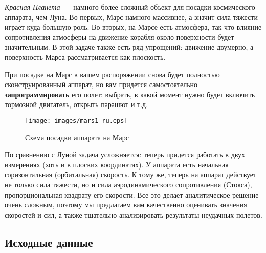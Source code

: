 \documentclass[12pt,a4paper]{article}
\begin{document}
\emph{Красная Планета}~--- намного более сложный объект для посадки космического аппарата,
чем Луна. Во-первых, Марс намного массивнее, а значит сила тяжести играет куда большую
роль. Во-вторых, на Марсе есть атмосфера, так что влияние сопротивления атмосферы на
движение корабля около поверхности будет значительным. В этой задаче также есть ряд
упрощений: движение двумерно, а поверхность Марса рассматривается как плоскость.

При посадке на Марс в вашем распоряжении снова будет полностью сконструированный аппарат,
но вам придется самостоятельно \textbf{запрограммировать} его полет: выбрать, в какой
момент нужно будет включить тормозной двигатель, открыть парашют и т.д.

\begin{figure}[tbh]
  \begin{center}
    \texttt{[image: images/mars1-ru.eps]}
    \caption{Схема посадки аппарата на Марс}
    \label{Pic:mars}
  \end{center}
\end{figure}

По сравнению с Луной задача усложняется: теперь придется работать в двух измерениях (хоть
и в плоских координатах). У аппарата есть начальная горизонтальная (орбитальная)
скорость. К тому же, теперь на аппарат действует не только сила тяжести, но и сила
аэродинамического сопротивления (Стокса), пропорциональная квадрату его скорости. Все это
делает аналитическое решение очень сложным, поэтому мы предлагаем вам качественно
оценивать значения скоростей и сил, а также тщательно анализировать результаты неудачных
полетов.

\subsection{Исходные данные}
\end{document}
